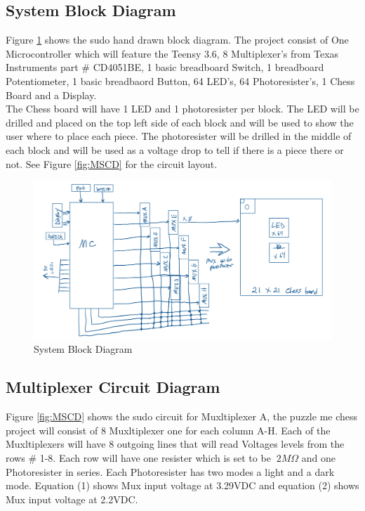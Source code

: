 \documentclass[11pt]{article}
\begin{document}
\subsection{System Block Diagram}
Figure \ref{fig:SBD1} shows the sudo hand drawn block diagram. The project consist of One Microcontroller which will feature the Teensy 3.6, 8 Multiplexer's from Texas Instruments part \# CD4051BE, 1 basic breadboard Switch, 1 breadboard Potentiometer, 1 basic breadbaord Button, 64 LED's, 64 Photoresister's, 1 Chess Board and a Display. 
\\


\noindent The Chess board will have 1 LED and 1 photoresister per block. The LED will be drilled and placed on the top left side of each block and will be used to show the user where to place each piece. The photoresister will be drilled in the middle of each block and will be used as a voltage drop to tell if there is a piece there or not. See Figure \ref{fig:MSCD} for the circuit layout. 

\begin{figure}
  \includegraphics[width=\linewidth]{./Pics/System_Block_Diagram.PNG}
  \caption{System Block Diagram}
  \label{fig:SBD1}
\end{figure}

\subsection{Multiplexer Circuit Diagram} 
Figure \ref{fig:MSCD} shows the sudo circuit for Muxltiplexer A, the puzzle me chess project will consist of 8 Muxltiplexer one for each column A-H. Each of the Muxltiplexers will have 8 outgoing lines that will read Voltages levels from the rows \# 1-8. Each row will have one resister which is set to be $~2M \Omega$ and one Photoresister in series. Each Photoresister has two modes a light and a dark mode. Equation (1) shows Mux input voltage at 3.29VDC and equation (2) shows Mux input voltage at 2.2VDC. 
\\
\end{document}
